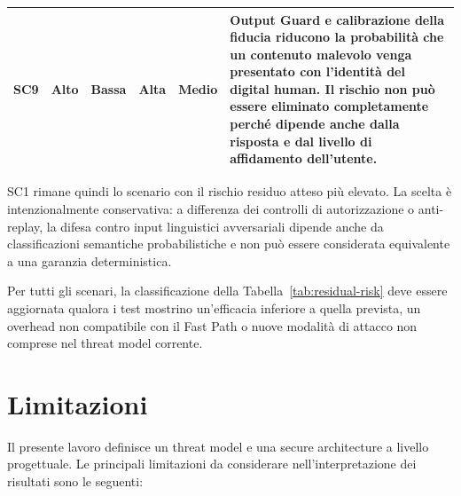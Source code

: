 \documentclass[11pt,a4paper]{article}
\newcommand{\alto}{\cellcolor{RiskHigh}\textbf{Alto}}
\newcommand{\medio}{\cellcolor{RiskMedium}\textbf{Medio}}
\begin{document}
\begin{longtable}{
    |C{1.20cm}|
    C{1.65cm}|
    C{1.70cm}|
    C{1.70cm}|
    C{1.65cm}|
    L{\dimexpr\textwidth-1.20cm-1.65cm-1.70cm-1.70cm-1.65cm-12\arrayrulewidth\relax}|
}
\textbf{SC9}
&
\alto
&
\textbf{Bassa}
&
\textbf{Alta}
&
\medio
&
Output Guard e calibrazione della fiducia riducono la probabilità che
un contenuto malevolo venga presentato con l'identità del digital
human. Il rischio non può essere eliminato completamente perché
dipende anche dalla risposta e dal livello di affidamento
dell'utente.
\\
\hline

\end{longtable}
\endgroup

SC1 rimane quindi lo scenario con il rischio residuo atteso più
elevato. La scelta è intenzionalmente conservativa: a differenza dei
controlli di autorizzazione o anti-replay, la difesa contro input
linguistici avversariali dipende anche da classificazioni semantiche
probabilistiche e non può essere considerata equivalente a una
garanzia deterministica.

Per tutti gli scenari, la classificazione della
Tabella~\ref{tab:residual-risk} deve essere aggiornata qualora i test
mostrino un'efficacia inferiore a quella prevista, un overhead non
compatibile con il Fast Path o nuove modalità di attacco non comprese
nel threat model corrente.


\section{Limitazioni}
\label{sec:limitations}

Il presente lavoro definisce un threat model e una secure architecture
a livello progettuale. Le principali limitazioni da considerare
nell'interpretazione dei risultati sono le seguenti:
\end{document}
